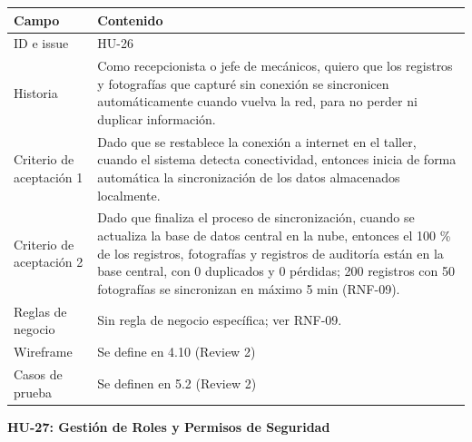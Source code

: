 {\def\LTcaptype{none} %
\begin{longtable}[]{@{}
  >{\raggedright\arraybackslash}p{}
  >{\raggedright\arraybackslash}p{}@{}}
\toprule\noalign{}
\begin{minipage}[b]{\linewidth}\raggedright
\textbf{Campo}
\end{minipage} & \begin{minipage}[b]{\linewidth}\raggedright
\textbf{Contenido}
\end{minipage} \\
\midrule\noalign{}
\endhead
\bottomrule\noalign{}
\endlastfoot
ID e issue & HU-26 \\
Historia & Como recepcionista o jefe de mecánicos, quiero que los
registros y fotografías que capturé sin conexión se sincronicen
automáticamente cuando vuelva la red, para no perder ni duplicar
información. \\
Criterio de aceptación 1 & Dado que se restablece la conexión a internet
en el taller, cuando el sistema detecta conectividad, entonces inicia de
forma automática la sincronización de los datos almacenados
localmente. \\
Criterio de aceptación 2 & Dado que finaliza el proceso de
sincronización, cuando se actualiza la base de datos central en la nube,
entonces el 100 \% de los registros, fotografías y registros de
auditoría están en la base central, con 0 duplicados y 0 pérdidas; 200
registros con 50 fotografías se sincronizan en máximo 5 min
(RNF-09). \\
Reglas de negocio & Sin regla de negocio específica; ver RNF-09. \\
Wireframe & Se define en 4.10 (Review 2) \\
Casos de prueba & Se definen en 5.2 (Review 2) \\
\end{longtable}
}

\textbf{HU-27: Gestión de Roles y Permisos de Seguridad}

